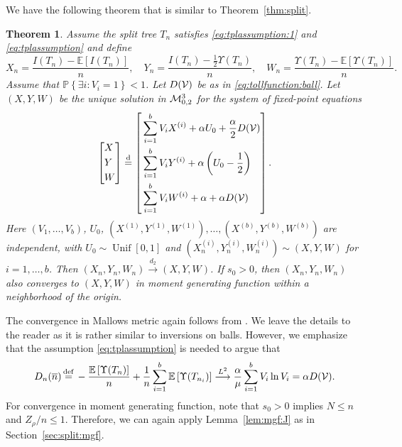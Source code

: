 \documentclass[11pt]{article}
\newcommand{\E}[1]{\mathbb{E} \left[#1\right]}
\newcommand{\mZeroIII}{\cM_{0,2}^{3}}
\newcommand{\nVec}{(X, Y, W)}
\newcommand{\nVecI}{\left(X_n^{(i)}, Y_{n}^{(i)}, W_{n}^{(i)}\right)}
\newcommand{\nVecN}{(X_n, Y_n, W_n)}
\newcommand\cM{{\cal M}}
\newcommand\cV{{\cal V}}
\def\U{\Upsilon}
\def\a{\alpha}
\def\m{\mu}
\newcommand\Prob[1]{{\mathbb{P}\left\{#1\right\}}}
\newtheorem{theorem}{Theorem}
\numberwithin{theorem}{section}
\theoremstyle{definition}
\newcommand{\dM}{d_2}
\newcommand{\dMto}{\overset{\dM}{\too}}
\newcommand{\inLII}{\overset{L^{2}}{\too}}
\newcommand{\eqd}{\,{\buildrel {\mathrm{def}} \over =}\,}
\newcommand{\eql}{\eqdd}%
\newcommand{\Unif}{\mathop{\mathrm{Unif}}}
\newcommand{\nBar}{\overline{n}}
\newcommand{\Toll}{D}
\newcommand{\TollN}{\Toll_{n}}
\numberwithin{equation}{section}
\newcommand{\refT}[1]{Theorem~\ref{#1}}
\newcommand{\refL}[1]{Lemma~\ref{#1}}
\newcommand{\refS}[1]{Section~\ref{#1}}
\newcommand{\too}{\longrightarrow}
\newcommand\eqdd{\overset{\mathrm{d}}{=}}
\begin{document}
We have the following theorem that is similar to \refT{thm:split}.
\begin{theorem}
Assume the split tree $T_n$ satisfies \eqref{eq:tplassumption:1} and \eqref{eq:tplassumption} and define
$$
X_n = \frac{I(T_n) - \E{I(T_n)}}{n}, \quad Y_n = \frac{I(T_n) - \frac12 \U(T_n)}{n}, \quad W_n = \frac{\U(T_n) - \E{\U(T_n)}}{n}.
$$
Assume that \(\Prob{\exists i:V_i = 1} < 1\).
Let $\Toll(\cV)$ be as in \eqref{eq:tollfunction:ball}.
Let $\nVec$ be the unique solution in \(\mZeroIII\) for the
system of
fixed-point equations
\begin{equation}
    \left[
    \begin{aligned}
        & X \\
        & Y \\
        & W
    \end{aligned}
    \right]
    \eql
    \left[
    \begin{aligned}
        & \sum_{i=1}^b V_i X^{(i)} + \a U_0 + \frac{\a}{2}\Toll(\cV) \\
        & \sum_{i=1}^b V_i Y^{(i)} + \a \left(U_0-\frac{1}{2}\right) \\
        & \sum_{i=1}^b V_i W^{(i)} + \a + \a \Toll(\cV)
    \end{aligned}
    \right]
    .
\end{equation}
Here \( (V_{1},\dots,V_{b})\), \(U_{0}\),
\(
    (X^{(1)}, Y^{(1)}, W^{(1)}),
    \dots,
    (X^{(b)}, Y^{(b)}, W^{(b)})
\)
are independent,
with \(U_{0} \sim \Unif[0,1]\) and
\(\nVecI \sim \nVec\) for \(i = 1,\dots,b\).
Then \(\nVecN \dMto \nVec\).
If \(s_0 > 0\), then \(\nVecN\) also converges to \(\nVec\) in moment generating function
within a neighborhood of the origin.
\end{theorem}

The convergence in Mallows metric again follows from \citet[Theorem 4.1]{MR1871564}. We leave the
details to the reader as it is rather similar to inversions on balls.
However, we emphasize that the assumption \eqref{eq:tplassumption} is needed to argue that
\begin{equation}
    \TollN(\nBar) \eqd -\frac{\E{\U(T_n)}}{n} + \frac1n\sum_{i=1}^b \E{\U(T_{n_i})} 
    \inLII
    \frac{\a}{\m} \sum_{i=1}^b V_i\ln V_i = \a \Toll(\cV).
    \label{eq:c:n:w}
\end{equation}
For convergence in moment generating function, note that \(s_0 > 0\) implies \(N \le n\) and
\(Z_{\rho}/n \le 1\). Therefore, we can again apply \refL{lem:mgf:J} as in \refS{sec:split:mgf}.
\end{document}
